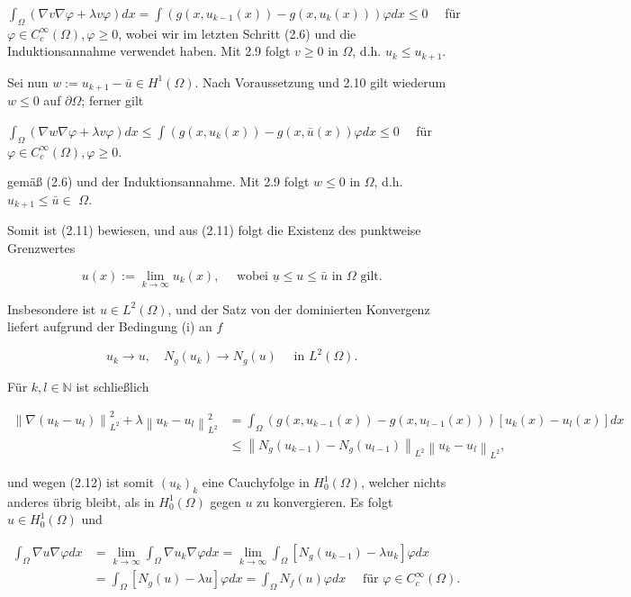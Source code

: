 \documentclass[10pt, letterpaper]{article}
\begin{document}
$\int_{\Omega}(\nabla v \nabla \varphi+\lambda v \varphi) d x=\int\left(g\left(x, u_{k-1}(x)\right)-g\left(x, u_{k}(x)\right)\right) \varphi d x \leq 0 \quad$ für $\varphi \in C_{c}^{\infty}(\Omega), \varphi \geq 0$,
wobei wir im letzten Schritt (2.6) und die Induktionsannahme verwendet haben. Mit 2.9 folgt $v \geq 0$ in $\Omega$, d.h. $u_{k} \leq u_{k+1}$.

Sei nun $w:=u_{k+1}-\bar{u} \in H^{1}(\Omega)$. Nach Voraussetzung und 2.10 gilt wiederum $w \leq 0$ auf $\partial \Omega$; ferner gilt

$\int_{\Omega}(\nabla w \nabla \varphi+\lambda v \varphi) d x \leq \int\left(g\left(x, u_{k}(x)\right)-g(x, \bar{u}(x)) \varphi d x \leq 0 \quad\right.$ für $\varphi \in C_{c}^{\infty}(\Omega), \varphi \geq 0$.

gemäß (2.6) und der Induktionsannahme. Mit 2.9 folgt $w \leq 0$ in $\Omega$, d.h. $u_{k+1} \leq \bar{u} \in$ $\Omega$.

Somit ist (2.11) bewiesen, und aus (2.11) folgt die Existenz des punktweise Grenzwertes

$$
u(x):=\lim _{k \rightarrow \infty} u_{k}(x), \quad \text { wobei } \underline{u} \leq u \leq \bar{u} \text { in } \Omega \text { gilt. }
$$

Insbesondere ist $u \in L^{2}(\Omega)$, und der Satz von der dominierten Konvergenz liefert aufgrund der Bedingung (i) an $f$

$$
u_{k} \rightarrow u, \quad N_{g}\left(u_{k}\right) \rightarrow N_{g}(u) \quad \text { in } L^{2}(\Omega) \text {. }
$$

Für $k, l \in \mathbb{N}$ ist schließlich

$$
\begin{aligned}
\left\|\nabla\left(u_{k}-u_{l}\right)\right\|_{L^{2}}^{2}+\lambda\left\|u_{k}-u_{l}\right\|_{L^{2}}^{2} & =\int_{\Omega}\left(g\left(x, u_{k-1}(x)\right)-g\left(x, u_{l-1}(x)\right)\right)\left[u_{k}(x)-u_{l}(x)\right] d x \\
& \leq\left\|N_{g}\left(u_{k-1}\right)-N_{g}\left(u_{l-1}\right)\right\|_{L^{2}}\left\|u_{k}-u_{l}\right\|_{L^{2}},
\end{aligned}
$$

und wegen (2.12) ist somit $\left(u_{k}\right)_{k}$ eine Cauchyfolge in $H_{0}^{1}(\Omega)$, welcher nichts anderes übrig bleibt, als in $H_{0}^{1}(\Omega)$ gegen $u$ zu konvergieren. Es folgt $u \in H_{0}^{1}(\Omega)$ und

$$
\begin{aligned}
\int_{\Omega} \nabla u \nabla \varphi d x & =\lim _{k \rightarrow \infty} \int_{\Omega} \nabla u_{k} \nabla \varphi d x=\lim _{k \rightarrow \infty} \int_{\Omega}\left[N_{g}\left(u_{k-1}\right)-\lambda u_{k}\right] \varphi d x \\
& =\int_{\Omega}\left[N_{g}(u)-\lambda u\right] \varphi d x=\int_{\Omega} N_{f}(u) \varphi d x \quad \text { für } \varphi \in C_{c}^{\infty}(\Omega) .
\end{aligned}
$$
\end{document}
